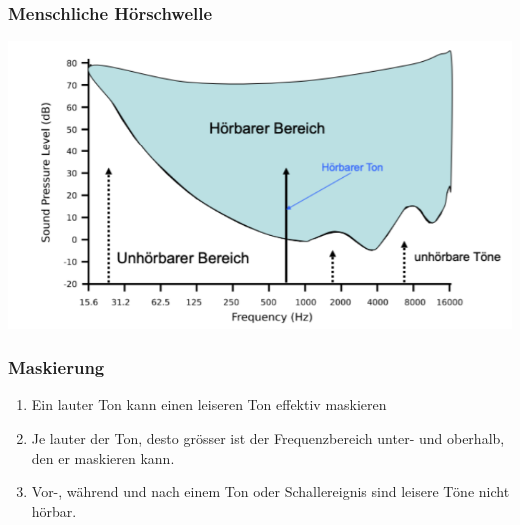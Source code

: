 \subsubsection{Menschliche Hörschwelle}%
\label{ssub:menschliche_hörschwelle}

\begin{center}
    \includegraphics[width=1\linewidth]{images/hoerschwelle.png}
\end{center}

\subsubsection{Maskierung}%
\label{ssub:maskierung}
\begin{enumerate}
    \item Ein lauter Ton kann einen leiseren Ton effektiv maskieren
    \item Je lauter der Ton, desto grösser ist der Frequenzbereich unter- und oberhalb, den er maskieren kann.
    \item Vor-, während und nach einem Ton oder Schallereignis sind leisere Töne nicht hörbar.
\end{enumerate}
\vfill
